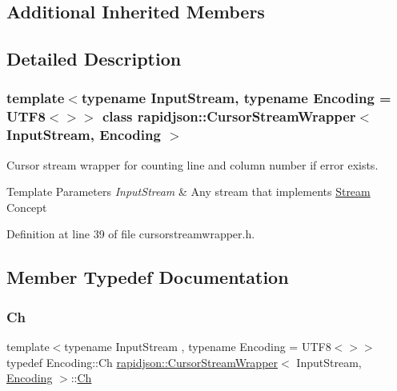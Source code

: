 \subsection*{Additional Inherited Members}


\subsection{Detailed Description}
\subsubsection*{template$<$typename Input\+Stream, typename Encoding = U\+T\+F8$<$$>$$>$\newline
class rapidjson\+::\+Cursor\+Stream\+Wrapper$<$ Input\+Stream, Encoding $>$}

Cursor stream wrapper for counting line and column number if error exists. 


\begin{DoxyTemplParams}{Template Parameters}
{\em Input\+Stream} & Any stream that implements \mbox{\hyperlink{classrapidjson_1_1_stream}{Stream}} Concept \\
\hline
\end{DoxyTemplParams}


Definition at line 39 of file cursorstreamwrapper.\+h.



\subsection{Member Typedef Documentation}
\mbox{\label{classrapidjson_1_1_cursor_stream_wrapper_a49421838afb7b754a756193896e8273b}} 
\subsubsection{\texorpdfstring{Ch}{Ch}}
{\footnotesize\ttfamily template$<$typename Input\+Stream , typename Encoding  = U\+T\+F8$<$$>$$>$ \\
typedef Encoding\+::\+Ch \mbox{\hyperlink{classrapidjson_1_1_cursor_stream_wrapper}{rapidjson\+::\+Cursor\+Stream\+Wrapper}}$<$ Input\+Stream, \mbox{\hyperlink{classrapidjson_1_1_encoding}{Encoding}} $>$\+::\mbox{\hyperlink{classrapidjson_1_1_cursor_stream_wrapper_a49421838afb7b754a756193896e8273b}{Ch}}}



